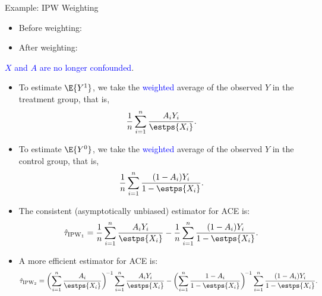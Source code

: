 \begin{Example}{Example: IPW Weighting}
      \begin{itemize}
            \item Before weighting:
                  \begin{center}
                  \end{center}
            \item After weighting:
                  \begin{center}
                  \end{center}
      \end{itemize}
      \tcblower{}
      \textcolor{Blue}{$ X $ and $ A $ are no longer confounded}.
\end{Example}
\begin{Regular}{}
      \begin{itemize}
            \item To estimate $ \E{Y^1} $, we take the \textcolor{Blue}{weighted} average of the observed $ Y $ in the treatment group, that is,
                  \[ \frac{1}{n}\sum_{i=1}^{n}\frac{A_i Y_i}{\estps{X_i}}. \]
            \item To estimate $ \E{Y^0} $, we take the \textcolor{Blue}{weighted} average of the observed $ Y $ in the control group, that is,
                  \[ \frac{1}{n}\sum_{i=1}^{n}\frac{(1-A_i)Y_i}{1-\estps{X_i}}. \]
            \item The consistent (asymptotically unbiased) estimator for ACE is:
                  \[ \hat{\tau}_{\IPW_1}= \frac{1}{n}\sum_{i=1}^{n}\frac{A_i Y_i}{\estps{X_i}}-\frac{1}{n}\sum_{i=1}^{n}\frac{(1-A_i)Y_i}{1-\estps{X_i}}. \]
            \item A more efficient estimator for ACE is:
                  \[ \hat{\tau}_{\IPW_2}=
                        \biggl(\sum_{i=1}^{n}\frac{A_i}{\estps{X_i}}\biggr)^{\!-1}
                        \sum_{i=1}^{n}\frac{A_i Y_i}{\estps{X_i}}-
                        \biggl(\sum_{i=1}^{n}\frac{1-A_i}{1-\estps{X_i}}\biggr)^{\!-1}
                        \sum_{i=1}^{n}\frac{(1-A_i)Y_i}{1-\estps{X_i}}. \]
      \end{itemize}
\end{Regular}
